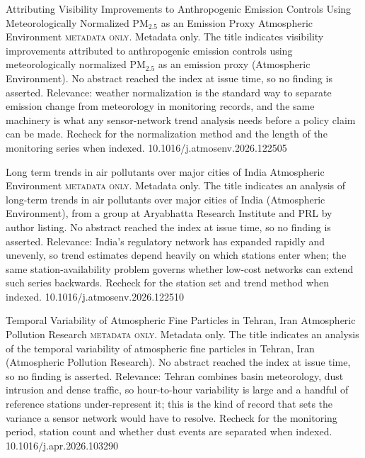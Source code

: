 \documentclass[10pt]{article}
\begin{document}
{Attributing Visibility Improvements to Anthropogenic Emission Controls Using Meteorologically Normalized PM$_{2.5}$ as an Emission Proxy}
{Atmospheric Environment}
{\textsc{metadata only.} Metadata only. The title indicates visibility improvements attributed to anthropogenic emission controls using meteorologically normalized PM$_{2.5}$ as an emission proxy (Atmospheric Environment). No abstract reached the index at issue time, so no finding is asserted. Relevance: weather normalization is the standard way to separate emission change from meteorology in monitoring records, and the same machinery is what any sensor-network trend analysis needs before a policy claim can be made. Recheck for the normalization method and the length of the monitoring series when indexed.}
{10.1016/j.atmosenv.2026.122505}

{Long term trends in air pollutants over major cities of India}
{Atmospheric Environment}
{\textsc{metadata only.} Metadata only. The title indicates an analysis of long-term trends in air pollutants over major cities of India (Atmospheric Environment), from a group at Aryabhatta Research Institute and PRL by author listing. No abstract reached the index at issue time, so no finding is asserted. Relevance: India's regulatory network has expanded rapidly and unevenly, so trend estimates depend heavily on which stations enter when; the same station-availability problem governs whether low-cost networks can extend such series backwards. Recheck for the station set and trend method when indexed.}
{10.1016/j.atmosenv.2026.122510}

{Temporal Variability of Atmospheric Fine Particles in Tehran, Iran}
{Atmospheric Pollution Research}
{\textsc{metadata only.} Metadata only. The title indicates an analysis of the temporal variability of atmospheric fine particles in Tehran, Iran (Atmospheric Pollution Research). No abstract reached the index at issue time, so no finding is asserted. Relevance: Tehran combines basin meteorology, dust intrusion and dense traffic, so hour-to-hour variability is large and a handful of reference stations under-represent it; this is the kind of record that sets the variance a sensor network would have to resolve. Recheck for the monitoring period, station count and whether dust events are separated when indexed.}
{10.1016/j.apr.2026.103290}
\end{document}
